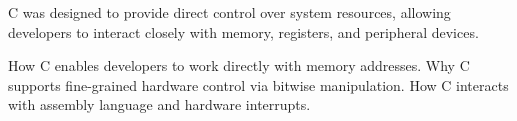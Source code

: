 \begin{NxSSSBox}
	\begin{NxIDBox}
		C was designed to provide direct control over system resources, allowing developers to interact closely with memory, registers, and peripheral devices.
	\end{NxIDBox}
	\begin{NxIDBoxL}
		 How C enables developers to work directly with memory addresses.
		 Why C supports fine-grained hardware control via bitwise manipulation.
		 How C interacts with assembly language and hardware interrupts.
	\end{NxIDBoxL}
\end{NxSSSBox}

